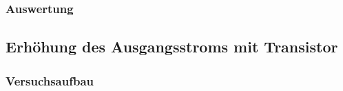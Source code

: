 \documentclass[12pt,a4paper]{article}
\begin{document}
\subsubsection{Auswertung}
\subsection{Erhöhung des Ausgangsstroms mit Transistor}
\subsubsection{Versuchsaufbau}
\end{document}
